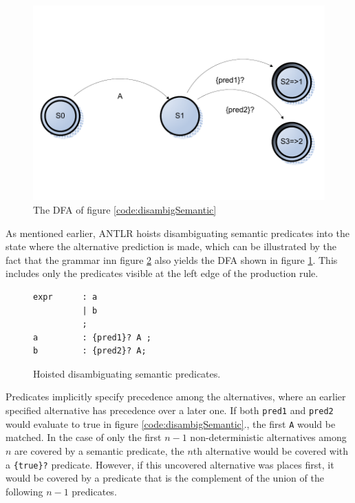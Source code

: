 \begin{figure}[!h]
  \centering
    \includegraphics[scale=0.6]{img/disambigsemantic}
  \caption{The DFA of figure \ref{code:disambigSemantic}}
  \label{fig:dfaDisambiguate}
\end{figure}
As mentioned earlier, ANTLR hoists disambiguating semantic predicates into the state where the alternative prediction is made, which can be illustrated by the fact that the grammar inn figure \ref{code:disambigSemanticHoist} also yields the DFA shown in figure \ref{fig:dfaDisambiguate}. This includes only the predicates visible at the left edge of the production rule. 
\begin{figure}[h!]
\begin{verbatim}
expr      : a 
          | b
          ;
a         : {pred1}? A ;
b         : {pred2}? A;
\end{verbatim}
\caption{Hoisted disambiguating semantic predicates.}
\label{code:disambigSemanticHoist}
\end{figure}
Predicates implicitly specify precedence among the alternatives, where an earlier specified alternative has precedence over a later one. If both \verb!pred1! and \verb!pred2! would evaluate to true in figure \ref{code:disambigSemantic}., the first \verb!A! would be matched. In the case of only the first $n-1$ non-deterministic alternatives among $n$ are covered by a semantic predicate, the $n$th alternative would be covered with a \verb!{true}?! predicate. However, if this uncovered alternative was places first, it would be covered by a predicate that is the complement of the union of the following $n-1$ predicates.

